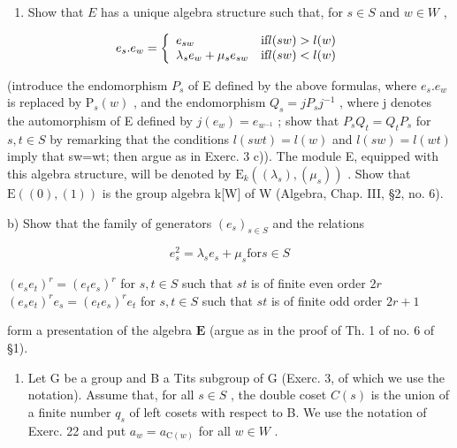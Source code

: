 \begin{enumerate}
\def\labelenumi{\alph{enumi})}
\tightlist
\item
  Show that \(E\) has a unique algebra structure such that, for \(s \in S\) and \(w \in W\) ,
\end{enumerate}

\[
e _ {s}. e _ {w} = \left\{ \begin{array}{l l} e _ {s w} & \text {if} l (s w) > l (w) \\ \lambda_ {s} e _ {w} + \mu_ {s} e _ {s w} & \text {if} l (s w) <   l (w) \end{array} \right.
\]

(introduce the endomorphism \(P_{s}\) of E defined by the above formulas, where \(e_{s}.e_{w}\) is replaced by \(\mathrm{P}_{s}(w)\) , and the endomorphism \(Q_{s}=jP_{s}j^{-1}\) , where j denotes the automorphism of E defined by \(j(e_{w})=e_{w^{-1}}\) ; show that \(P_{s}Q_{t}=Q_{t}P_{s}\) for \(s,t\in S\) by remarking that the conditions \(l(swt)=l(w)\) and \(l(sw)=l(wt)\) imply that sw=wt; then argue as in Exerc. 3 c)). The module E, equipped with this algebra structure, will be denoted by \(\mathrm{E}_{k}((\lambda_{s}),(\mu_{s}))\) . Show that \(\mathrm{E}((0),(1))\) is the group algebra k{[}W{]} of W (Algebra, Chap. III, §2, no. 6).

b) Show that the family of generators \((e_s)_{s\in S}\) and the relations

\[
e _ {s} ^ {2} = \lambda_ {s} e _ {s} + \mu_ {s} \mathrm{for} s \in S
\]

\((e_s e_t)^r = (e_t e_s)^r\) for \(s, t \in S\) such that \(st\) is of finite even order \(2r\) \((e_s e_t)^r e_s = (e_t e_s)^r e_t\) for \(s, t \in S\) such that \(st\) is of finite odd order \(2r + 1\)

form a presentation of the algebra \(\mathbf{E}\) (argue as in the proof of Th. 1 of no. 6 of §1).

\begin{enumerate}
\def\labelenumi{\arabic{enumi})}
\setcounter{enumi}{23}
\tightlist
\item
  Let G be a group and B a Tits subgroup of G (Exerc. 3, of which we use the notation). Assume that, for all \(s \in S\) , the double coset \(C(s)\) is the union of a finite number \(q_{s}\) of left cosets with respect to B. We use the notation of Exerc. 22 and put \(a_{w} = a_{\mathrm{C}(w)}\) for all \(w \in W\) .
\end{enumerate}

